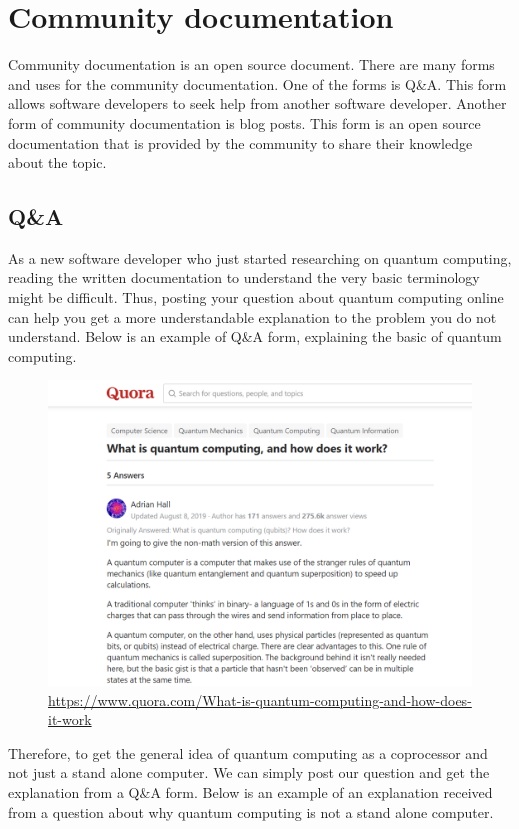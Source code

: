 \documentclass{article}
\begin{document}
\newpage



\section{Community documentation}

Community documentation is an open source document. There are many forms and uses for the community documentation. One of the forms is Q&A. This form allows software developers to seek help from another software developer. Another form of community documentation is blog posts. This form is an open source documentation that is provided by the community to share their knowledge about the topic.

\subsection{Q&A}
As a new software developer who just started researching on quantum computing, reading the written documentation to understand the very basic terminology might be difficult. Thus, posting your question about quantum computing online can help you get a more understandable explanation to the problem you do not understand. Below is an example of Q&A form, explaining the basic of quantum computing.

\begin{figure}[htbp]
\centerline{\includegraphics[width=\textwidth]{6.png}}
\caption{\url{https://www.quora.com/What-is-quantum-computing-and-how-does-it-work}}
\label{fig}
\end{figure}

Therefore, to get the general idea of quantum computing as a coprocessor and not just a stand alone computer. We can simply post our question and get the explanation from a Q&A form. Below is an example of an explanation received from a question about why quantum computing is not a stand alone computer.
\end{document}
